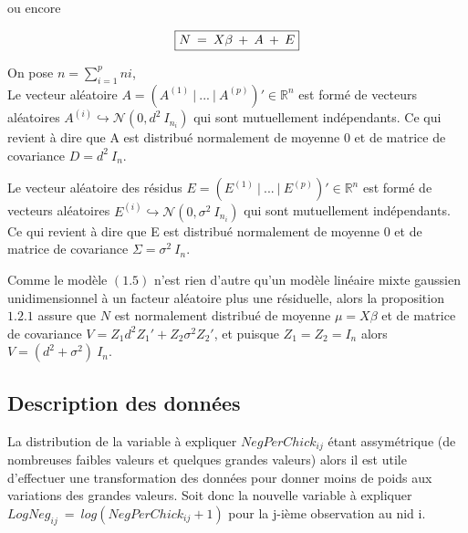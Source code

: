 \documentclass[11pt,fleqn]{book} %
\begin{document}
ou encore

\begin{equation}
\fbox{$
N\:=\:X\beta\:+\:A\:+\:E
$}
\end{equation}

\vspace{1em}

On pose $n=\sum_{i=1}^{p} ni$,\\ 

Le vecteur aléatoire $A=\left(A^{(1)}\:|\:...\:|\:A^{(p)}\right)'\in \mathbb{R}^{n}$ est formé de vecteurs aléatoires $A^{(i)}\hookrightarrow\mathcal{N}(0,d^2\:I_{n_i})$ qui sont mutuellement indépendants. Ce qui revient à dire que A est distribué normalement de moyenne $0$ et de matrice de covariance $D=d^2\:I_n$.  

\vspace{1em}

Le vecteur aléatoire des résidus $E=\left(E^{(1)}\:|\:...\:|\:E^{(p)}\right)'\in \mathbb{R}^{n}$ est formé de vecteurs aléatoires $E^{(i)}\hookrightarrow\mathcal{N}(0,\sigma^2\:I_{n_i})$ qui sont mutuellement indépendants. Ce qui revient à dire que E est distribué normalement de moyenne $0$ et de matrice de covariance $\Sigma=\sigma^2\:I_n$.  

\vspace{1em}

Comme le modèle $(1.5)$ n'est rien d'autre qu'un modèle linéaire mixte gaussien unidimensionnel à un facteur aléatoire plus une résiduelle, alors la proposition $1.2.1$ assure que $N$ est normalement distribué de moyenne $\mu=X\beta$ et de matrice de covariance $V= Z_1 d^2 Z_1' + Z_2 \sigma^2 Z_2'$, et puisque $Z_1=Z_2=I_n $ \: alors \: $ V=(d^2 + \sigma^2) \:I_n$.

\newpage 

\subsection{Description des données} 

\vspace{1em}

La distribution de la variable à expliquer $NegPerChick_{ij}$ étant assymétrique (de nombreuses faibles valeurs et quelques grandes valeurs) alors il est utile d'effectuer une transformation des données pour donner moins de poids aux variations des grandes valeurs. 
Soit donc la nouvelle variable à expliquer $LogNeg_{ij}\:=\:log(NegPerChick_{ij}+1)$ pour la j-ième observation au nid i.
\vspace{2em}
\end{document}

